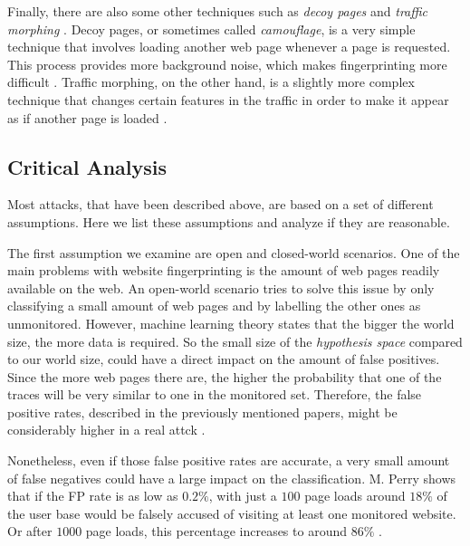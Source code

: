Finally, there are also some other techniques such as \textit{decoy pages} and \textit{traffic morphing} \cite{wright2009traffic,panchenko1}.
Decoy pages, or sometimes called \textit{camouflage}, is a very simple technique that involves loading another web page whenever a page is requested.
This process provides more background noise, which makes fingerprinting more difficult \cite{panchenko1}.
Traffic morphing, on the other hand, is a slightly more complex technique that changes certain features in the traffic in order to make it appear as if another page is loaded \cite{wright2009traffic}.

\subsection{Critical Analysis}

Most attacks, that have been described above, are based on a set of different assumptions.
Here we list these assumptions and analyze if they are reasonable.

The first assumption we examine are open and closed-world scenarios.
One of the main problems with website fingerprinting is the amount of web pages readily available on the web.
An open-world scenario tries to solve this issue by only classifying a small amount of web pages and by labelling the other ones as unmonitored.
However, machine learning theory states that the bigger the world size, the more data is required.
So the small size of the \textit{hypothesis space} compared to our world size, could have a direct impact on the amount of false positives.
Since the more web pages there are, the higher the probability that one of the traces will be very similar to one in the monitored set.
Therefore, the false positive rates, described in the previously mentioned papers, might be considerably higher in a real attck \cite{wfpcritique}.

\newpage

Nonetheless, even if those false positive rates are accurate, a very small amount of false negatives could have a large impact on the classification.
M. Perry shows that if the FP rate is as low as $0.2\%$, with just a $100$ page loads around $18\%$ of the user base would be falsely accused of visiting at least one monitored website.
Or after $1000$ page loads, this percentage increases to around $86\%$ \cite{wfpcritique}.

